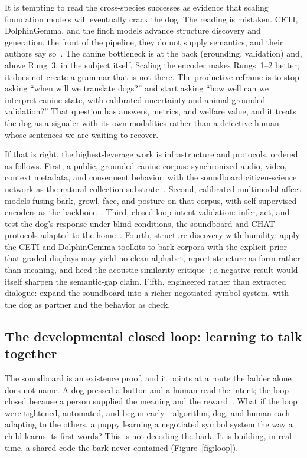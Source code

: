 It is tempting to read the cross-species successes as evidence that scaling
foundation models will eventually crack the dog. The reading is mistaken.
CETI, DolphinGemma, and the finch models advance structure discovery and
generation, the front of the pipeline; they do not supply semantics, and
their authors say so~\cite{sharma2024whale,google2025dolphingemma}. The
canine bottleneck is at the back (grounding, validation) and, above Rung~3,
in the subject itself. Scaling the encoder makes Rungs~1--2 better; it does
not create a grammar that is not there. The productive reframe is to stop
asking ``when will we translate dogs?'' and start asking ``how well can we
interpret canine state, with calibrated uncertainty and animal-grounded
validation?'' That question has answers, metrics, and welfare value, and it
treats the dog as a signaler with its own modalities rather than a defective
human whose sentences we are waiting to recover.

If that is right, the highest-leverage work is infrastructure and protocols,
ordered as follows. First, a public, grounded canine corpus: synchronized
audio, video, context metadata, and consequent behavior, with the soundboard
citizen-science network as the natural collection
substrate~\cite{bastos2024plos,hagiwara2023beans}. Second, calibrated
multimodal affect models fusing bark, growl, face, and posture on that
corpus, with self-supervised encoders as the
backbone~\cite{hagiwara2023aves,robinson2024naturelm,ghani2023perch}. Third,
closed-loop intent validation: infer, act, and test the dog's response under
blind conditions, the soundboard and CHAT protocols adapted to the
home~\cite{bastos2024scirep,google2025dolphingemma}. Fourth, structure
discovery with humility: apply the CETI and DolphinGemma toolkits to bark
corpora with the explicit prior that graded displays may yield no clean
alphabet, report structure as form rather than meaning, and heed the
acoustic-similarity critique~\cite{yovel2025critique}; a negative result
would itself sharpen the semantic-gap claim. Fifth, engineered rather than
extracted dialogue: expand the soundboard into a richer negotiated symbol
system, with the dog as partner and the behavior as check.

\subsection{The developmental closed loop: learning to talk together}
The soundboard is an existence proof, and it points at a route the ladder
alone does not name. A dog pressed a button and a human read the intent;
the loop closed because a person supplied the meaning and the
reward~\cite{bastos2024plos,bastos2024scirep}. What if the loop were tightened,
automated, and begun early---algorithm, dog, and human each adapting to the
others, a puppy learning a negotiated symbol system the way a child learns
its first words? This is not decoding the bark. It is building, in real
time, a shared code the bark never contained (Figure~\ref{fig:loop}).

